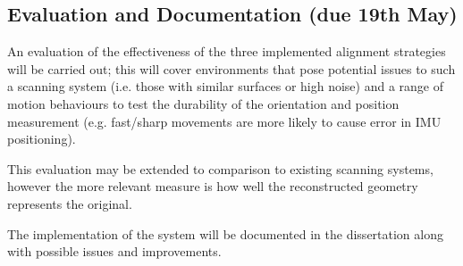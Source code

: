 \documentclass{entcs}
\begin{document}
\subsection{Evaluation and Documentation (due 19th May)}
\label{sec:evaluation}

An evaluation of the effectiveness of the three implemented alignment strategies
will be carried out; this will cover environments that pose potential issues to
such a scanning system (i.e. those with similar surfaces or high noise) and a
range of motion behaviours to test the durability of the orientation and
position measurement (e.g. fast/sharp movements are more likely to cause error
in IMU positioning).

This evaluation may be extended to comparison to existing scanning systems,
however the more relevant measure is how well the reconstructed geometry
represents the original.

The implementation of the system will be documented in the dissertation along
with possible issues and improvements.

\printbibliography
\end{document}
